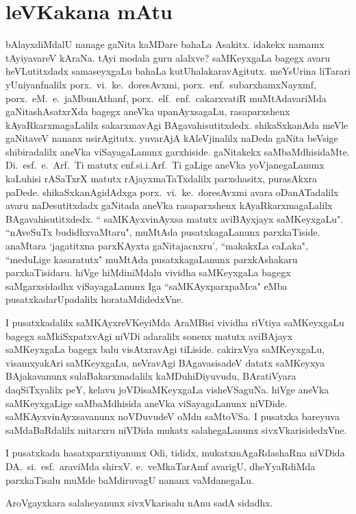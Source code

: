 \chapter{leVKakana mAtu}
\vskip -20pt

bAlayxdiMdalU nanage gaNita kaMDare bahaLa Asakitx. idakekx namamx tAyiyavareV kAraNa. tAyi modala 
guru alalxve? saMKeyxgaLa bagegx avaru heVLutitxdadx samaseyxgaLu bahaLa kutUhalakaravAgitutx. 
meYsUrina liTarari yUniyanfnalilx porx.\ vi.~ke.\ doresAvxmi, porx.\ enf.\ subarxhamxNayxmf, 
porx.\ eM.\ e.\ jaMbunAthanf, porx.\ elf.~enf.~cakarxvatiR muMtAdavariMda gaNitashAsatxrXda bagegx aneVka upanAyxsagaLu, rasaparxshenx kAyaR\-karxmagaLalilx sakarxmavAgi BAgavahisutitxdedx. shikaSxkanAda meVle gaNitaveV nananx usirAgitutx. yuvarAjA kAleVjinalilx naDeda gaNita beVsige shibiradalilx aneVka viSayagaLanunx garxhiside. gaNitakekx saMbaMdhisidaMte. Di.\ esf.\ e.\ Arf.\ 
Ti matutx enf.si.i.Arf.~Ti gaLige aneVka yoVjanegaLanunx kaLuhisi rASaTxrX matutx rAjayxmaTaTxdalilx parxshasitx, purasAkxra paDede. shikaSxkanAgidAdxga porx.\ vi.\ ke.\ doresAvxmi avara oDanATadalilx avaru naDesutitxdadx gaNitada aneVka rasaparxshenx kAyaRkarxmagaLalilx BAgavahisutitxdedx. `` saMKAyxvinAyxsa matutx aviBAyxjayx saMKeyxgaLu". ``nAveSuTx budidhxvaMtaru", muMtAda pusatxkagaLanunx parxkaTiside. anaMtara `jagatitxna parxKAyxta gaNitajacnxru', ``makakxLa caLaka", ``meduLige kasaratutx" muMtAda pusatxkagaLanunx parxkAshakaru parxkaTisidaru. hiVge hiMdiniMdalu vividha saMKeyxgaLa bagegx saMgarxsidadhx viSayagaLanunx Iga ``saMKAyxparxpaMca" eMba pusatxkadarUpadalilx horataMdidedxVne. 

I pusatxkadalilx saMKAyxreVKeyiMda AraMBisi vividha riVtiya saMKeyxgaLu bagegx saMkiSxpatxvAgi niVDi adaralilx sonenx matutx aviBAjayx saMKeyxgaLa bagegx balu visAtxravAgi tiLiside. cakirxVya saMKeyxgaLu, visamxyakAri saMKeyxgaLu, neVravAgi BAgavasisadeV datatx saMKeyxya BAjakavanunx sulaBakarxmadalilx kaMDuhiDiyuvudu, BAratiVyara daqSiTxyalilx peY, kelavu joVDisaMKeyxgaLa visheVSaguNa. hiVge aneVka saMKeyxgaLige saMbaMdhisida aneVka viSayagaLanunx niVDide. saMKAyxvinAyxsavanunx noVDuvudeV oMdu saMtoVSa. I pusatxka bareyuva saMdaBaRdalilx mitarxru niVDida mukatx salahegaLanunx sivxVkarisidedxVne.

I pusatxkada hasatxparxtiyanunx Odi, tididx, mukatxmAgaRdashaRna niVDida DA.\ si.~esf.\ araviMda shirxV. e.\ veMkaTarAmf avarigU, dheYyaRdiMda parxkaTisalu muMde baMdiruvagU nananx vaMdanegaLu.

AroVgayxkara salaheyanunx sivxVkarisalu nAnu sadA sidadhx.
